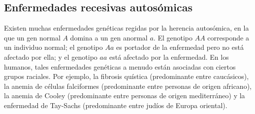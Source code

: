 
\newpage

\subsection*{Enfermedades recesivas autosómicas}

Existen muchas enfermedades genéticas regidas por la herencia autosómica, en la que un gen normal $A$ domina a un gen anormal $a$. El genotipo $AA$ corresponde a un individuo normal; el genotipo $Aa$ es portador de la enfermedad pero no está afectado por ella; y el genotipo $aa$ está afectado por la enfermedad. En los humanos, tales enfermedades genéticas a menudo están asociadas con ciertos grupos raciales. Por ejemplo, la fibrosis quística (predominante entre caucásicos), la anemia de células falciformes (predominante entre personas de origen africano), la anemia de Cooley (predominante entre personas de origen mediterráneo) y la enfermedad de Tay-Sachs (predominante entre judíos de Europa oriental).

